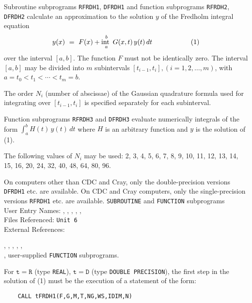                              
        
\Submitter{}                                
                          \Revised{ }
Subroutine subprograms {\tt RFRDH1}, {\tt DFRDH1} and function
subprograms {\tt RFRDH2}, {\tt DFRDH2} calculate an approximation to the
solution $y$ of the Fredholm integral equation
$$y(x) \ = \ F(x)+ \displaystyle \int_a^b G(x,t)\,y(t)\,dt
\hspace{20mm} (1) $$
over the interval $[a,b]$. The function $F$ must not be identically zero.
The interval $[a,b]$ may be divided into $m$ subintervals
$[t_{i-1},t_i], (i=1,2,\ldots,m)$, with
$a = t_0 < t_1 < \cdots < t_m = b$.
\par
The order $N_i$ (number of abscissae) of the Gaussian quadrature
formula used for integrating over $[t_{i-1},t_i]$ is specified
separately for each subinterval.
\par
Function subprograms {\tt RFRDH3} and {\tt DFRDH3} evaluate numerically
integrals of the form $\displaystyle \int_a^b H(t)\,y(t)\,dt$
where $H$ is an arbitrary function and $y$ is the solution of (1).
\par
The following values of $N_i$ may be used:
2, 3, 4, 5, 6, 7, 8, 9, 10, 11, 12, 13, 14, 15, 16,
20, 24, 32, 40, 48, 64, 80, 96.
\par
On computers other than CDC and Cray, only the double-precision versions
{\tt DFRDH1} etc. are available.
On CDC and Cray computers, only the single-precision versions
{\tt RFRDH1} etc. are available.
\Structure
{\tt SUBROUTINE} and {\tt FUNCTION} subprograms \\
User Entry Names: , , ,
, ,  \\
Files Referenced: {\tt Unit 6} \\
External References: \parbox[t]{128mm} {
, , ,
, , \\ 
, user-supplied {\tt FUNCTION} subprograms.}
\Usage
For $\mathtt{t=R}$ (type {\tt REAL}), $\mathtt{t=D}$ (type
{\tt DOUBLE PRECISION}), the first step in the solution of (1)
must be the execution of a statement of the form:
\begin{verbatim}
    CALL tFRDH1(F,G,M,T,NG,WS,IDIM,N)
\end{verbatim}

